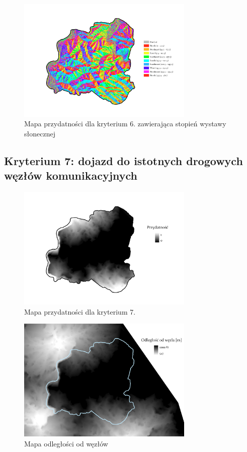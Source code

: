 \documentclass{article}
\begin{document}
\begin{figure}[H]
    \centering
    \includegraphics[width=0.75\textwidth]{img/plesna-kryterium6-aspect.jpg}
    \caption{Mapa przydatności dla kryterium 6. zawierająca stopień wystawy słonecznej}
\end{figure}

\subsection{Kryterium 7: dojazd do istotnych drogowych węzłów komunikacyjnych}

\begin{figure}[H]
    \centering
    \includegraphics[width=0.75\textwidth]{img/plesna-kryterium7-layout.jpg}
    \caption{Mapa przydatności dla kryterium 7.}
\end{figure}

\begin{figure}[H]
    \centering
    \includegraphics[width=0.75\textwidth]{img/plesna-kryterium7-wezly.jpg}
    \caption{Mapa odległości od węzłów}
\end{figure}
\end{document}
